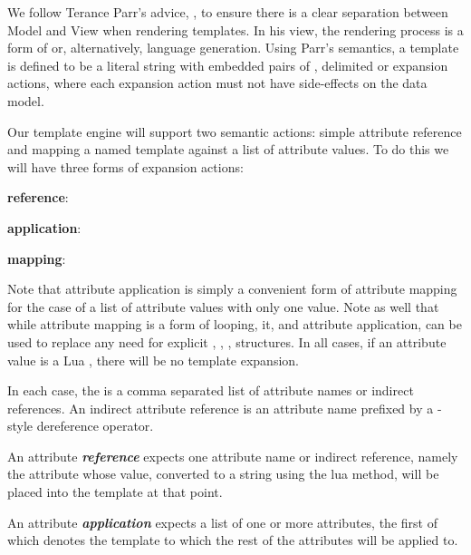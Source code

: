 
\startchapter[title=A Lua Rendering Engine]

We follow Terance Parr's advice, \cite{parr2004templateMVC}, to ensure 
there is a clear separation between Model and View when rendering 
templates. In his view, the rendering process is a form of 
 or, alternatively, language generation. Using Parr's 
 semantics, a template is defined to be a literal string with 
embedded pairs of \quote{\{\{}, \quote{\}\}} delimited  or 
expansion actions, where each expansion action must not have side-effects 
on the data model. 

Our template engine will support two semantic actions: simple attribute 
reference and mapping a named template against a list of attribute values. 
To do this we will have three forms of expansion actions: 

\startitemize
\item {\bf reference}:  

\item {\bf application}: 

\item {\bf mapping}: 

\stopitemize

Note that attribute application is simply a convenient form of attribute 
mapping for the case of a list of attribute values with only one value. 
Note as well that while attribute mapping is a form of  
 looping, it, and attribute application, can be used to replace 
any need for explicit , , ,  
structures. In all cases, if an attribute value is a Lua , there 
will be no template expansion. 

In each case, the  is a comma separated list of 
attribute names or indirect references. An indirect attribute reference is 
an attribute name prefixed by a -style \quote{*} dereference 
operator.

An attribute \emph{\bf reference} expects one attribute name or indirect 
reference, namely the attribute whose value, converted to a string using 
the lua  method, will be placed into the template 
 at that point. 

An attribute \emph{\bf application} expects a list of one or more attributes, 
the first of which denotes the template to which the rest of the 
attributes will be applied to.

